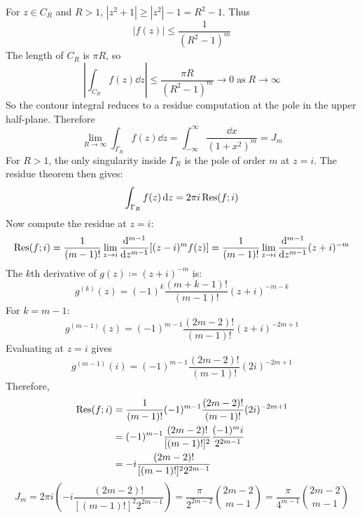 For $z \in C_{R}$ and $R > 1$, $|z^{2} + 1| \geq |z^{2}| - 1 = R^{2} - 1$. Thus
\begin{equation*}
    |f(z)| \leq \frac{1}{(R^{2} - 1)^{m}}
\end{equation*}
The length of $C_{R}$ is $\pi R$, so
\begin{equation*}
    \left|\int_{C_{R}}f(z)\dd z\right| \leq \frac{\pi R}{(R^{2} - 1)^{m}} \to 0 \; \text{as} \; R \to \infty
\end{equation*}
So the contour integral reduces to a residue computation at the pole in the upper half-plane. Therefore
\begin{equation*}
    \lim_{R \to \infty} \int_{\Gamma_{R}}f(z)\dd z = \int_{-\infty}^{\infty} \frac{\dd x}{(1 + x^{2})^{m}} = J_{m}
\end{equation*}
For $R > 1$, the only singularity inside $\Gamma_{R}$ is the pole of order $m$ at $z = i$. The residue theorem then gives:
\begin{equation*}
    \int_{\Gamma_{R}}f(z)\mathop{}\!\mathrm{d} z = 2\pi i\operatorname{Res}(f; i)
\end{equation*}
Now compute the residue at $z = i$:
\begin{equation*}
    \operatorname{Res}(f; i) = \frac{1}{(m - 1)!} \lim_{z \to i} \frac{\mathop{}\!\mathrm{d}^{m - 1}}{\mathop{}\!\mathrm{d} z^{m - 1}}[(z - i)^{m}f(z)]
        = \frac{1}{(m - 1)!} \lim_{z \to i} \frac{\mathop{}\!\mathrm{d}^{m - 1}}{\mathop{}\!\mathrm{d} z^{m - 1}}(z + i)^{-m}
\end{equation*}
The $k$th derivative of $g(z) \coloneqq (z + i)^{-m}$ is:
\begin{equation*}
    g^{(k)}(z) = (-1)^{k} \frac{(m + k - 1)!}{(m - 1)!}(z + i)^{-m - k}
\end{equation*}
For $k = m - 1$:
\begin{equation*}
    g^{(m - 1)}(z) = (-1)^{m - 1} \frac{(2m - 2)!}{(m - 1)!}(z + i)^{-2m + 1}
\end{equation*}
Evaluating at $z = i$ gives
\begin{equation*}
    g^{(m - 1)}(i) = (-1)^{m - 1} \frac{(2m - 2)!}{(m - 1)!}(2i)^{-2m + 1}
\end{equation*}
Therefore,
\begin{equation*}
    \begin{aligned}
        \operatorname{Res}(f; i)
        &= \frac{1}{(m - 1)!}(-1)^{m - 1} \frac{(2m - 2)!}{(m - 1)!}(2i)^{-2m + 1} \\
        &= (-1)^{m - 1} \frac{(2m - 2)!}{[(m - 1)!]^{2}} \frac{(-1)^{m}i}{2^{2m - 1}} \\
        &= -i \frac{(2m - 2)!}{[(m - 1)!]^{2}2^{2m - 1}} \\
    \end{aligned}
\end{equation*}
\begin{equation} \label{eq:IV.6.1}
    J_{m} = 2\pi i\left(-i \frac{(2m - 2)!}{[(m - 1)!]^{2}2^{2m - 1}}\right) = \frac{\pi}{2^{2m - 2}} \binom{2m - 2}{m - 1}
        = \frac{\pi}{4^{m - 1}} \binom{2m - 2}{m - 1}
\end{equation}

